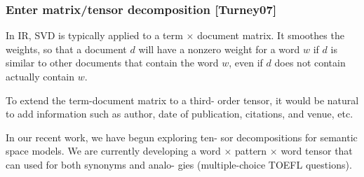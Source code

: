 \begin{frame}[plain]
	\frametitle{Enter matrix/tensor decomposition [Turney07]}
	\begin{block}{}
    In IR, SVD is typically applied to a term $\times$
    document matrix. It smoothes the weights, so that a document $d$
    will have a nonzero weight for a word $w$ if $d$ is similar to other
    documents that contain the word $w$, even if $d$ does not contain
    actually contain $w$. 
	\end{block}
	\begin{block}{}
    To extend the term-document matrix to a third-
    order tensor, it would be natural to add information
    such as author, date of publication, citations, and
    venue, etc.
	\end{block}
	\begin{block}{}
    In our recent work, we have begun exploring ten-
    sor decompositions for semantic space models. We
    are currently developing a word $\times$ pattern $\times$ word
    tensor that can used for both synonyms and analo-
    gies (multiple-choice TOEFL questions).
	\end{block}
\end{frame}
